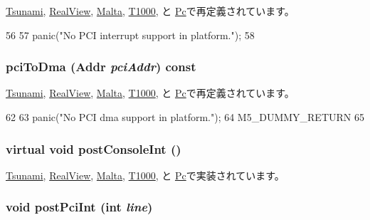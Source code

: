 \hyperlink{classTsunami_a0d98ea2b236bb883fa15d63a59a2ec9e}{Tsunami}, \hyperlink{classRealView_a0d98ea2b236bb883fa15d63a59a2ec9e}{RealView}, \hyperlink{classMalta_a0d98ea2b236bb883fa15d63a59a2ec9e}{Malta}, \hyperlink{classT1000_a0d98ea2b236bb883fa15d63a59a2ec9e}{T1000}, と \hyperlink{classPc_a0d98ea2b236bb883fa15d63a59a2ec9e}{Pc}で再定義されています。


\begin{DoxyCode}
56 {
57    panic("No PCI interrupt support in platform.");
58 }
\end{DoxyCode}
\hypertarget{classPlatform_a87078b3d3a28ae134f6736337e90dac3}{
\subsubsection[{pciToDma}]{ pciToDma ({\bf Addr} {\em pciAddr}) const}}
\label{classPlatform_a87078b3d3a28ae134f6736337e90dac3}


\hyperlink{classTsunami_a87078b3d3a28ae134f6736337e90dac3}{Tsunami}, \hyperlink{classRealView_a87078b3d3a28ae134f6736337e90dac3}{RealView}, \hyperlink{classMalta_a87078b3d3a28ae134f6736337e90dac3}{Malta}, \hyperlink{classT1000_a87078b3d3a28ae134f6736337e90dac3}{T1000}, と \hyperlink{classPc_a87078b3d3a28ae134f6736337e90dac3}{Pc}で再定義されています。


\begin{DoxyCode}
62 {
63    panic("No PCI dma support in platform.");
64    M5_DUMMY_RETURN
65 }
\end{DoxyCode}
\hypertarget{classPlatform_a24ab6780a0fa391b19980027355ba467}{
\subsubsection[{postConsoleInt}]{\setlength{\rightskip}{0pt plus 5cm}virtual void postConsoleInt ()}}
\label{classPlatform_a24ab6780a0fa391b19980027355ba467}


\hyperlink{classTsunami_a5b278cebc0a62bc2195edf27f059ab1a}{Tsunami}, \hyperlink{classRealView_a5b278cebc0a62bc2195edf27f059ab1a}{RealView}, \hyperlink{classMalta_a5b278cebc0a62bc2195edf27f059ab1a}{Malta}, \hyperlink{classT1000_a5b278cebc0a62bc2195edf27f059ab1a}{T1000}, と \hyperlink{classPc_a5b278cebc0a62bc2195edf27f059ab1a}{Pc}で実装されています。\hypertarget{classPlatform_a545d1445357706d7259aa73104f44222}{
\subsubsection[{postPciInt}]{\setlength{\rightskip}{0pt plus 5cm}void postPciInt (int {\em line})}}
\label{classPlatform_a545d1445357706d7259aa73104f44222}


